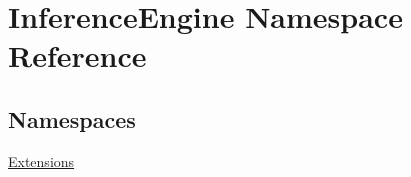 \hypertarget{namespaceInferenceEngine}{}\section{Inference\+Engine Namespace Reference}
\label{namespaceInferenceEngine}
\subsection*{Namespaces}
\begin{DoxyCompactItemize}
\item 
 \hyperlink{namespaceInferenceEngine_1_1Extensions}{Extensions}
\end{DoxyCompactItemize}
